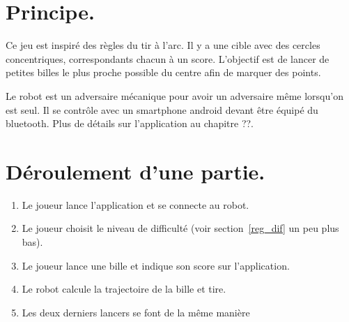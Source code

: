 \section{Principe.}

Ce jeu est inspiré des règles du tir à l'arc. Il y a une cible avec des cercles concentriques, correspondants chacun à un score. L'objectif est de lancer de petites billes le plus proche possible du centre afin de marquer des points.

Le robot est un adversaire mécanique pour avoir un adversaire même lorsqu'on est seul. Il se contrôle avec un smartphone android devant être équipé du bluetooth. Plus de détails sur l'application au chapitre ??.%

\section{Déroulement d'une partie.}
\begin{enumerate}
	\item Le joueur lance l'application et se connecte au robot.
	\item Le joueur choisit le niveau de difficulté (voir section~\ref{reg_dif} un peu plus bas).
	\item Le joueur lance une bille et indique son score sur l'application.
	\item Le robot calcule la trajectoire de la bille et tire.
	\item Les deux derniers lancers se font de la même manière
\end{enumerate}
